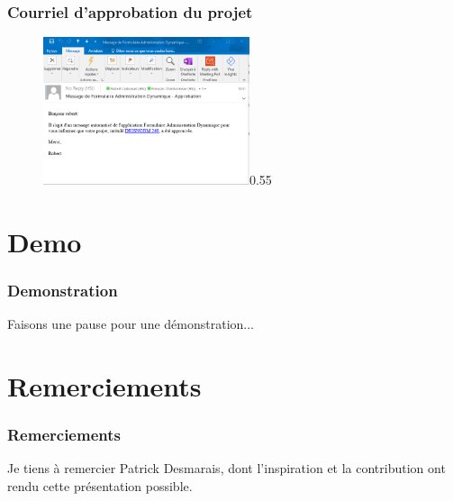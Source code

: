 \documentclass[aspectratio=169]{beamer}%
\let\note\relax
\begin{document}
\begin{frame}
\transwipe 
  \centering
      \frametitle{Courriel d'approbation du projet}
      \begin{figure}
    
    \centering
    \begin{annotate}{\includegraphics[width=0.54\textwidth]{email-approuve}}{0.55}
        
    \end{annotate}
\end{figure}
\end{frame}
\section{Demo}
\begin{frame}
\transwipe 
\frametitle{Demonstration}
\centering
Faisons une pause pour une démonstration...
\end{frame}


\section{Remerciements}
\begin{frame}
\transwipe 
\frametitle{Remerciements}
Je tiens à remercier Patrick Desmarais, dont l'inspiration et la contribution ont rendu cette présentation possible.

\end{frame}
\end{document}
